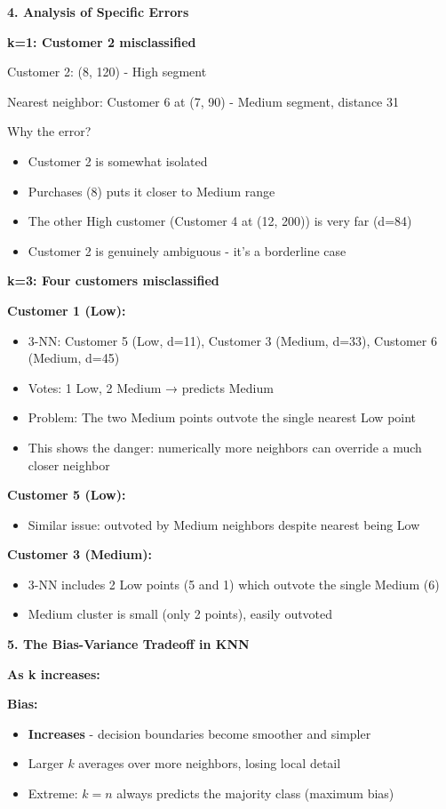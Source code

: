 \documentclass[12pt]{article}
\begin{document}
\begin{explanation}
\textbf{4. Analysis of Specific Errors}

\textbf{k=1: Customer 2 misclassified}

Customer 2: (8, 120) - High segment

Nearest neighbor: Customer 6 at (7, 90) - Medium segment, distance 31

Why the error?
\begin{itemize}
    \item Customer 2 is somewhat isolated
    \item Purchases (8) puts it closer to Medium range
    \item The other High customer (Customer 4 at (12, 200)) is very far (d=84)
    \item Customer 2 is genuinely ambiguous - it's a borderline case
\end{itemize}

\textbf{k=3: Four customers misclassified}

\textbf{Customer 1 (Low):}
\begin{itemize}
    \item 3-NN: Customer 5 (Low, d=11), Customer 3 (Medium, d=33), Customer 6 (Medium, d=45)
    \item Votes: 1 Low, 2 Medium → predicts Medium
    \item Problem: The two Medium points outvote the single nearest Low point
    \item This shows the danger: numerically more neighbors can override a much closer neighbor
\end{itemize}

\textbf{Customer 5 (Low):}
\begin{itemize}
    \item Similar issue: outvoted by Medium neighbors despite nearest being Low
\end{itemize}

\textbf{Customer 3 (Medium):}
\begin{itemize}
    \item 3-NN includes 2 Low points (5 and 1) which outvote the single Medium (6)
    \item Medium cluster is small (only 2 points), easily outvoted
\end{itemize}

\textbf{5. The Bias-Variance Tradeoff in KNN}

\textbf{As k increases:}

\textbf{Bias:}
\begin{itemize}
    \item \textbf{Increases} - decision boundaries become smoother and simpler
    \item Larger \(k\) averages over more neighbors, losing local detail
    \item Extreme: \(k=n\) always predicts the majority class (maximum bias)
\end{itemize}


\end{explanation}
\end{document}
